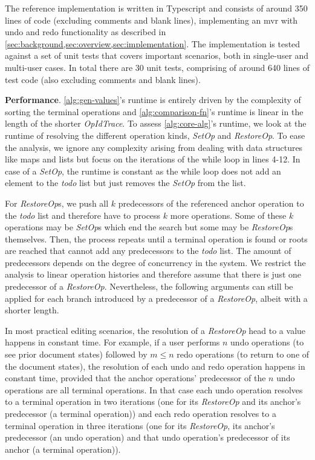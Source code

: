 \documentclass[sigplan,natbib=false,review]{acmart}
\newcommand{\setopkind}{\textit{SetOp}}
\newcommand{\restopkind}{\textit{RestoreOp}}
\newcommand{\opidtrace}{\textit{OpIdTrace}}
\begin{document}
The reference implementation is written in Typescript and consists of around 350
lines of code (excluding comments and blank lines),
implementing an \gls*{mvr} with undo and redo functionality as described
in \cref{sec:background,sec:overview,sec:implementation}.
The implementation is tested against a set of unit tests that covers important
scenarios, both in single-user and multi-user cases.
In total there are 30 unit tests,
comprising of around 640 lines of test code (also excluding comments and blank lines).

\textbf{Performance}.
\autoref{alg:gen-values}'s runtime is entirely driven by the
complexity of sorting the terminal operations and \cref{alg:comparison-fn}'s
runtime is linear in the length of the shorter \opidtrace{}.
To assess \autoref{alg:core-alg}'s runtime,
we look at the runtime of resolving the different operation kinds,
\setopkind{} and \restopkind{}.
To ease the analysis, we ignore any complexity arising from dealing with
data structures like maps and lists but focus on the iterations
of the while loop in lines 4-12.
In case of a \setopkind{}, the runtime is constant as the while loop
does not add an element to the \textit{todo} list but just removes the
\setopkind{} from the list.

For \restopkind{}s, we push all $k$ predecessors of the referenced anchor operation
to the \textit{todo} list and therefore have to process $k$ more operations.
Some of these $k$ operations may be \setopkind{}s which end the search but
some may be \restopkind{}s themselves. 
Then, the process repeats until a terminal operation is found or
roots are reached that cannot add any predecessors to the \textit{todo} list.
The amount of predecessors depends on the degree of concurrency in the system.
We restrict the analysis to linear operation histories and therefore assume
that there is just one predecessor of a \restopkind{}.
Nevertheless, the following arguments can still be applied for each branch
introduced by a predecessor of a \restopkind{}, albeit with a shorter length.

In most practical editing scenarios,
the resolution of a \restopkind{} head to a value happens in constant time.
For example, if a user performs $n$ undo operations (to see prior document states)
followed by $m \leq n$ redo operations (to return to one of the document states),
the resolution of each undo and redo operation happens in constant time,
provided that the anchor operations' predecessor of the $n$ undo operations
are all terminal operations.
In that case each undo operation resolves to a terminal operation in two iterations
(one for its \restopkind{} and its anchor's predecessor (a terminal operation))
and each redo operation resolves
to a terminal operation in three iterations
(one for its \restopkind{}, its anchor's
predecessor (an undo operation) and that undo operation's predecessor of its anchor
(a terminal operation)).
\end{document}
